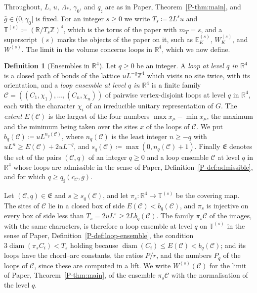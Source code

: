 \documentclass[11pt]{preprint}
\newcommand{\diam}{\operatorname{diam}}
\numberwithin{equation}{section}
\theoremstyle{definition}
\newtheorem{definition}[theorem]{Definition}
\theoremstyle{remark}
\theoremstyle{plain}
\begin{document}
Throughout, $L$, $u$, $\Lambda_*$, $\gamma_0$, and $q_\sharp$ are as in Paper, Theorem~\ref{P-thm:main}, and $\bar g \in (0, \gamma_0]$ is fixed. For an integer $s \geq 0$ we write $T_s \coloneqq 2L^su$ and $\mathbb T^{(s)} \coloneqq (\mathbb R/T_s\mathbb Z)^4$, which is the torus of the paper with $m_T = s$, and a superscript $(s)$ marks the objects of the paper on it, such as $\mathbb E^{(s)}_K$, $W^{(s)}_K$, and $W^{(s)}$. The limit in the volume concerns loops in $\mathbb R^4$, which we now define.

\begin{definition}[Ensembles in $\mathbb R^4$]\label{def:ensembles-plane}
Let $q \geq 0$ be an integer. A \emph{loop at level $q$ in $\mathbb R^4$} is a closed path of bonds of the lattice $uL^{-q}\mathbb Z^4$ which visits no site twice, with its orientation, and a \emph{loop ensemble at level $q$ in $\mathbb R^4$} is a finite family $\mathcal C = ((C_1, \chi_1), \dots, (C_n, \chi_n))$ of pairwise vertex-disjoint loops at level $q$ in $\mathbb R^4$, each with the character $\chi_i$ of an irreducible unitary representation of $G$. The \emph{extent} $E(\mathcal C)$ is the largest of the four numbers $\max x_\mu - \min x_\mu$, the maximum and the minimum being taken over the sites $x$ of the loops of $\mathcal C$. We put $b_q(\mathcal C) \coloneqq uL^{n_q(\mathcal C)}$, where $n_q(\mathcal C)$ is the least integer $n \geq -q$ with $uL^n \geq E(\mathcal C) + 2uL^{-q}$, and $s_q(\mathcal C) \coloneqq \max(0, n_q(\mathcal C) + 1)$. Finally $\mathfrak E$ denotes the set of the pairs $(\mathcal C, q)$ of an integer $q \geq 0$ and a loop ensemble $\mathcal C$ at level $q$ in $\mathbb R^4$ whose loops are admissible in the sense of Paper, Definition~\ref{P-def:admissible}, and for which $q \geq q_\sharp(c_{\mathcal C}, \bar g)$.
\end{definition}

Let $(\mathcal C, q) \in \mathfrak E$ and $s \geq s_q(\mathcal C)$, and let $\pi_s \colon \mathbb R^4 \to \mathbb T^{(s)}$ be the covering map. The sites of $\mathcal C$ lie in a closed box of side $E(\mathcal C) < b_q(\mathcal C)$, and $\pi_s$ is injective on every box of side less than $T_s = 2uL^s \geq 2Lb_q(\mathcal C)$. The family $\pi_s\mathcal C$ of the images, with the same characters, is therefore a loop ensemble at level $q$ on $\mathbb T^{(s)}$ in the sense of Paper, Definition~\ref{P-def:loop-ensemble}, the condition $3\diam(\pi_sC_i) < T_s$ holding because $\diam(C_i) \leq E(\mathcal C) < b_q(\mathcal C)$; and its loops have the chord--arc constants, the ratios $P/r$, and the numbers $P_q$ of the loops of $\mathcal C$, since these are computed in a lift. We write $W^{(s)}(\mathcal C)$ for the limit of Paper, Theorem~\ref{P-thm:main}, of the ensemble $\pi_s\mathcal C$ with the normalisation of the level $q$.
\end{document}
